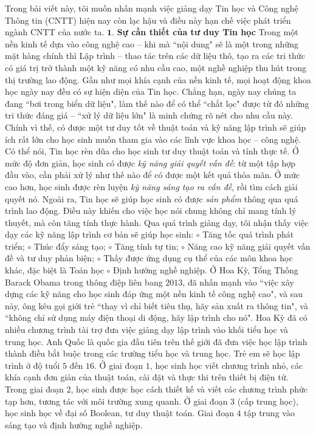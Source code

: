 \begin{multicols}{2}
	Trong bài viết này, tôi muốn nhấn mạnh việc giảng dạy Tin học và Công nghệ Thông tin (CNTT) hiện nay còn lạc hậu và điều này hạn chế việc phát triển ngành CNTT của nước ta.  
	\vskip 0.05cm
	$\pmb{1.}$ \textbf{\color{diendantoanhoc}Sự cần thiết của tư duy Tin học}
	\vskip 0.05cm
	Trong một nền kinh tế dựa vào công nghệ cao -- khi mà ``nội dung" sẽ là một trong những mặt hàng chính thì Lập trình -- thao tác trên các dữ liệu thô, tạo ra các tri thức có giá trị trở thành một kỹ năng có nhu cầu cao, một nghề nghiệp thu hút trong thị trường lao động. Gần như mọi khía cạnh của nền kinh tế, mọi hoạt động khoa học ngày nay đều có sự hiện diện của Tin học. Chẳng hạn, ngày nay chúng ta đang ``bơi trong biển dữ liệu", làm thế nào để có thể ``chắt lọc" được từ đó những tri thức đáng giá -- ``xử lý dữ liệu lớn" là minh chứng rõ nét cho nhu cầu này.
	\vskip 0.05cm
	Chính vì thế, có được một tư duy tốt về thuật toán và kỹ năng lập trình sẽ giúp ích rất lớn cho học sinh muốn tham gia vào các lĩnh vực khoa học -- công nghệ.
	\vskip 0.05cm
	Có thể nói, Tin học rèn dũa cho học sinh tư duy thuật toán và tính thực tế. Ở mức độ đơn giản, học sinh có được \textit{kỹ năng giải quyết vấn đề}: từ một tập hợp đầu vào, cần phải xử lý như thế nào để có được một kết quả thỏa mãn. Ở mức cao hơn, học sinh được rèn luyện \textit{kỹ năng sáng tạo ra vấn đề}, rồi tìm cách giải quyết nó. Ngoài ra, Tin học sẽ giúp học sinh có được \textit{sản phẩm} thông qua quá trình lao động. Điều này khiến cho việc học nói chung không chỉ mang tính lý thuyết, mà còn tăng tính thực hành.
	\vskip 0.05cm
	Qua quá trình giảng dạy, tôi nhận thấy việc dạy các kỹ năng lập trình cơ bản sẽ giúp học sinh:
	\vskip 0.05cm
	$\circ$	Tăng tốc quá trình phát triển;
	\vskip 0.05cm
	$\circ$	Thúc đẩy sáng tạo;
	\vskip 0.05cm
	$\circ$	Tăng tính tự tin;
	\vskip 0.05cm
	$\circ$	Năng cao kỹ năng giải quyết vấn đề và tư duy phản biện;
	\vskip 0.05cm
	$\circ$	Thấy được ứng dụng cụ thể của các môn khoa học khác, đặc biệt là Toán học
	\vskip 0.05cm
	$\circ$	Định hướng nghề nghiệp.
	\vskip 0.05cm
	Ở Hoa Kỳ, Tổng Thống Barack Obama trong thông điệp liên bang $2013$, đã nhấn mạnh vào ``việc xây dựng các kỹ năng cho học sinh đáp ứng một nền kinh tế công nghệ cao", và sau này, ông kêu gọi giới trẻ ``thay vì chỉ biết tiêu thụ, hãy sản xuất ra thông tin", và ``không chỉ sử dụng máy điện thoại di động, hãy lập trình cho nó". Hoa Kỳ đã có nhiều chương trình tài trợ đưa việc giảng dạy lập trình vào khối tiểu học và trung học.
	\vskip 0.05cm
	Anh Quốc là quốc gia đầu tiên trên thế giới đã đưa việc học lập trình thành điều bắt buộc trong các trường tiểu học và trung học. Trẻ em sẽ học lập trình ở độ tuổi $5$ đến $16$. Ở giai đoạn $1$, học sinh học viết chương trình nhỏ, các khía cạnh đơn giản của thuật toán, cài đặt và thực thi trên thiết bị điện tử. Trong giai đoạn $2$, học sinh được học cách thiết kế và viết các chương trình phức tạp hơn, tương tác với môi trường xung quanh. Ở giai đoạn $3$ (cấp trung học), học sinh học về đại số Boolean, tư duy thuật toán. Giai đoạn $4$ tập trung vào sáng tạo và định hướng nghề nghiệp.

\end{multicols}

